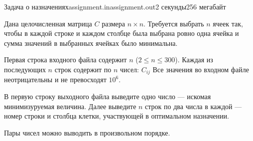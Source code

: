 \begin{problem}{Задача о назначениях}{assignment.in}{assignment.out}{2 секунды}{256 мегабайт}{}

Дана целочисленная матрица $C$ размера $n \times n$. Требуется выбрать $n$ ячеек так, чтобы
в каждой строке и каждом столбце была выбрана ровно одна ячейка и сумма значений 
в выбранных ячейках было минимальна.

\InputFile

Первая строка входного файла содержит $n$ ($2 \le n \le 300$).
Каждая из последующих $n$ строк содержит по $n$ чисел: $C_{ij}$ 
Все значения во входном файле неотрицательны и не превосходят $10^6$. 

\OutputFile

В первую строку выходного файла выведите одно число --- искомая минимизуруемая величина.
Далее выведите $n$ строк по два числа в каждой ---
номер строки и столбца клетки, участвующей в оптимальном назначении.

Пары чисел можно выводить в произвольном порядке.

\Examples

\begin{example}
%
\end{example}

\end{problem}
